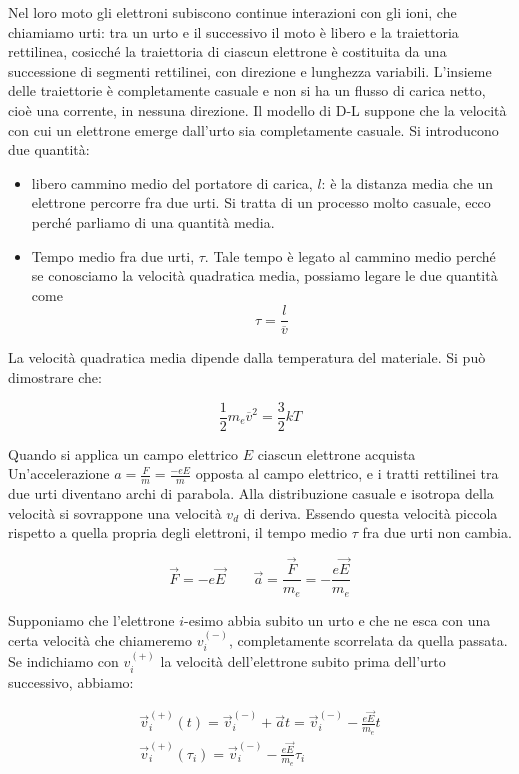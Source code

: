 Nel loro moto gli elettroni subiscono continue interazioni con gli ioni, che chiamiamo urti: tra un urto e il successivo il moto è libero e la traiettoria rettilinea, cosicché la traiettoria di ciascun elettrone è costituita da una successione di segmenti rettilinei, con direzione e lunghezza variabili. L'insieme delle traiettorie è completamente casuale e non si ha un flusso di carica netto, cioè una corrente, in nessuna direzione. Il modello di D-L suppone che la velocità con cui un elettrone emerge dall'urto sia completamente casuale. Si introducono due quantità:

\begin{itemize}
	\item libero cammino medio del portatore di carica, $l$: è la distanza media che un elettrone percorre fra due urti. Si tratta di un processo molto casuale, ecco perché parliamo di una quantità media.
	\item Tempo medio fra due urti, $\tau$. Tale tempo è legato al cammino medio perché se conosciamo la velocità quadratica media, possiamo legare le due quantità come
	\[
		\tau = \frac{l}{\overline{v}}
	\]
\end{itemize}

La velocità quadratica media dipende dalla temperatura del materiale. Si può dimostrare che:

\[
	\frac{1}{2} m_e \overline{v}^2 = \frac{3}{2} kT
\]

Quando si applica un campo elettrico $E$ ciascun elettrone acquista Un'accelerazione $a=\frac{F}{m}=\frac{-eE}{m}$ opposta al campo elettrico, e i tratti rettilinei tra due urti diventano archi di parabola. Alla distribuzione casuale e isotropa della velocità si sovrappone una velocità $ v_d  $ di deriva. Essendo questa velocità piccola rispetto a quella propria degli elettroni, il tempo medio $ \tau  $ fra due urti non cambia.

\[
	\vec{F} = -e\vec{E} \qquad \vec{a} =\frac{\vec{F}}{m_e} = - \frac{e\vec{E}}{m_e}
\]

Supponiamo che l'elettrone $i$-esimo abbia subito un urto e che ne esca con una certa velocità che chiameremo $v_i^{(-)}$, completamente scorrelata da quella passata. Se indichiamo con $v_i^{(+)}$ la velocità dell'elettrone subito prima dell'urto successivo, abbiamo:

\begin{gather*}
	\vec{v}_i^{(+)}(t) = \vec{v}_i^{(-)} + \vec{a}t = \vec{v}_i^{(-)} - \frac{e\vec{E}}{m_e} t \\
	\vec{v}_i^{(+)}(\tau_i) = \vec{v}_i^{(-)} - \frac{e\vec{E}}{m_e} \tau_i
\end{gather*}


